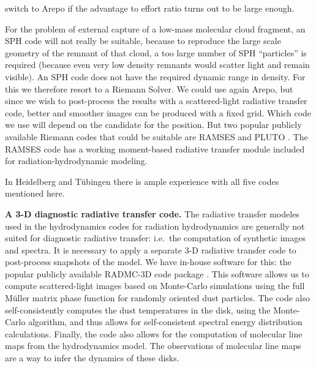 \documentclass[10pt,fleqn,twoside,a4paper]{article}
\begin{document}
\begin{compactenumerate}
\begin{compactitemize}
    switch to Arepo if the advantage to effort ratio turns out to be large
    enough.
  \item For the problem of external capture of a low-mass molecular cloud
    fragment, an SPH code will not really be suitable, because to reproduce
    the large scale geometry of the remnant of that cloud, a too large
    number of SPH ``particles'' is required (because even very low density
    remnants would scatter light and remain visible). An SPH code does not
    have the required dynamic range in density. For this we therefore resort
    to a Riemann Solver. We could use again Arepo, but since we wish to
    post-process the results with a scattered-light radiative transfer code,
    better and smoother images can be produced with a fixed grid. Which code
    we use will depend on the candidate for the position. But two popular
    publicly available Riemann codes that could be suitable are RAMSES
    \citep{2002A&A...385..337T} and PLUTO \citep{2007ApJS..170..228M}. The
    RAMSES code has a working moment-based radiative transfer module
    included for radiation-hydrodynamic modeling.
  \end{compactitemize}
  In Heidelberg and T\"ubingen there is ample experience with all five codes
  mentioned here. 
\item {\bf A 3-D diagnostic radiative transfer code.} The radiative transfer
  modeles used in the hydrodynamics codes for radiation hydrodynamics are
  generally not suited for diagnostic radiative transfer: i.e.\ the
  computation of synthetic images and spectra. It is necessary to apply a
  separate 3-D radiative transfer code to post-process snapshots of the
  model. We have in-house software for this: the popular publicly available
  RADMC-3D code package \citep{2012ascl.soft02015D}. This software allows us
  to compute scattered-light images based on Monte-Carlo simulations using
  the full M\"uller matrix phase function for randomly oriented dust
  particles.  The code also self-consistently computes the dust temperatures
  in the disk, using the \citet{2001ApJ...554..615B} Monte-Carlo algorithm,
  and thus allows for self-consistent spectral energy distribution
  calculations.  Finally, the code also allows for the computation of
  molecular line maps from the hydrodynamics model. The observations of
  molecular line maps are a way to infer the dynamics of these disks.
\end{compactenumerate}
\end{document}
